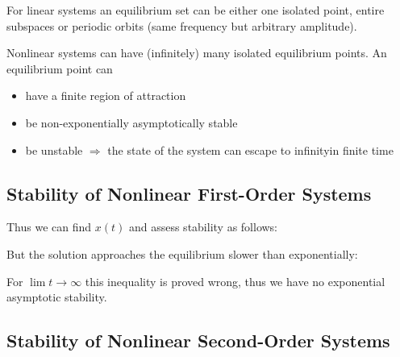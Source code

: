 \documentclass[10pt,a4paper]{scrartcl}
\begin{document}
\begin{multicols*}{3}

\finn

For linear systems an equilibrium set can be either one isolated point, entire subspaces or periodic orbits (same frequency but arbitrary amplitude).

Nonlinear systems can have (infinitely) many isolated equilibrium points. An equilibrium point can

\begin{itemize}
\ncompaq
\item have a finite region of attraction
\item be non-exponentially asymptotically stable
\item be unstable $\Rightarrow$ the state of the system can \glqq escape to infinity\grqq in finite time
\end{itemize}

\subsection{Stability of Nonlinear First-Order Systems}



Thus we can find $x(t)$ and assess stability as follows:



But the solution approaches the equilibrium slower than exponentially:


For $\lim t\rightarrow \infty$ this inequality is proved wrong, thus we have no exponential asymptotic stability.

\subsection{Stability of Nonlinear Second-Order Systems}



\end{multicols*}
\end{document}
